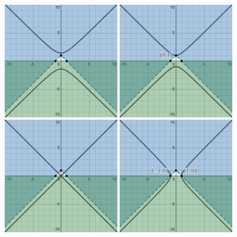 \documentclass{article}
\begin{document}
\begin{enumerate}
\begin{enumerate}
\begin{figure}[htbp]
    \centering
    \includegraphics[width=0.45\textwidth]{figures/HW1_3_a_-2.png}
    \includegraphics[width=0.45\textwidth]{figures/HW1_3_a_-1.png}
    \includegraphics[width=0.45\textwidth]{figures/HW1_3_a_0.png}
    \includegraphics[width=0.45\textwidth]{figures/HW1_3_a_1.png}

\end{figure}
\end{enumerate}
\end{enumerate}
\end{document}
